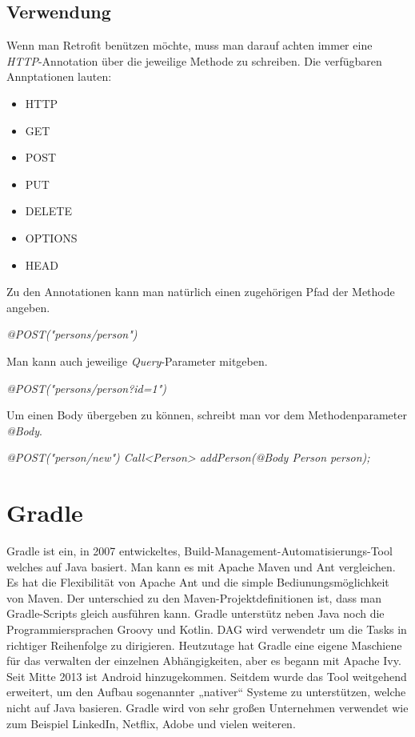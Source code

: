 \subsection{Verwendung}
Wenn man Retrofit benützen möchte, muss man darauf achten immer eine \textit{HTTP}-Annotation über die jeweilige Methode
zu schreiben. Die verfügbaren Annptationen lauten:

\begin{itemize}
    \item HTTP
    \item GET
    \item POST
    \item PUT
    \item DELETE
    \item OPTIONS
    \item HEAD
\end{itemize}


Zu den Annotationen kann man natürlich einen zugehörigen Pfad der Methode angeben.

\textit{@POST("persons/person")}

Man kann auch jeweilige \textit{Query}-Parameter mitgeben.

\textit{@POST("persons/person?id=1")}

Um einen Body übergeben zu können, schreibt man vor dem Methodenparameter \textit{@Body}.

\textit{
@POST("person/new")
Call<Person> addPerson(@Body Person person);
}



\section{Gradle}
\cite{Gradle1}
\cite{Gradle2}
\author{Bozidar Spasenovic}
Gradle ist ein, in 2007 entwickeltes, Build-Management-Automatisierungs-Tool welches auf Java basiert.
Man kann es mit Apache Maven und Ant vergleichen.
Es hat die Flexibilität von Apache Ant und die simple Bediunungsmöglichkeit von Maven.
Der unterschied zu den  Maven-Projektdefinitionen ist, dass man Gradle-Scripts gleich ausführen kann.
 Gradle unterstütz neben Java noch die Programmiersprachen Groovy und Kotlin.
DAG wird verwendetr um die Tasks in richtiger Reihenfolge zu dirigieren.
Heutzutage hat Gradle eine eigene Maschiene für das verwalten der einzelnen Abhängigkeiten, aber es begann mit Apache Ivy.
Seit Mitte 2013 ist Android hinzugekommen. Seitdem wurde das Tool weitgehend erweitert, um den Aufbau sogenannter „nativer“ Systeme zu unterstützen, welche nicht auf Java basieren.
Gradle wird von sehr großen Unternehmen verwendet wie zum Beispiel LinkedIn, Netflix, Adobe und vielen weiteren.

